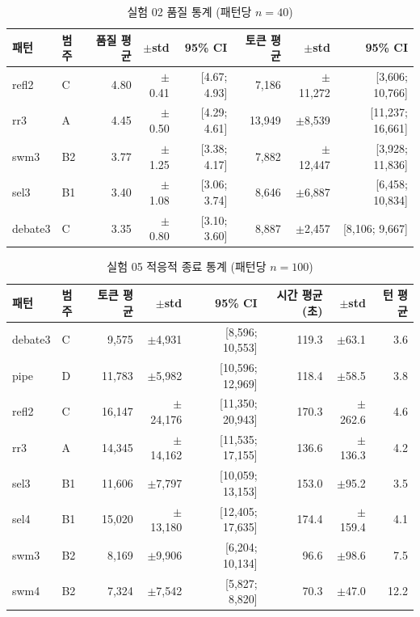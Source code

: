 \documentclass[a4paper,11pt]{article}
\begin{document}
\begin{table}[H]
\centering
\caption{실험 02 품질 통계 (패턴당 $n=40$)}
\label{tab:c2-exp02-stats}
{\footnotesize
\begin{tabular}{llrrrrrr}
\toprule
패턴 & 범주 & 품질 평균 & $\pm$std & 95\% CI & 토큰 평균 & $\pm$std & 95\% CI \\
\midrule
refl2   & C  & 4.80 & $\pm$0.41 & [4.67; 4.93]    & 7,186  & $\pm$11,272 & [3,606; 10,766] \\
rr3     & A  & 4.45 & $\pm$0.50 & [4.29; 4.61]    & 13,949 & $\pm$8,539  & [11,237; 16,661] \\
swm3    & B2 & 3.77 & $\pm$1.25 & [3.38; 4.17]    & 7,882  & $\pm$12,447 & [3,928; 11,836] \\
sel3    & B1 & 3.40 & $\pm$1.08 & [3.06; 3.74]    & 8,646  & $\pm$6,887  & [6,458; 10,834] \\
debate3 & C  & 3.35 & $\pm$0.80 & [3.10; 3.60]    & 8,887  & $\pm$2,457  & [8,106; 9,667] \\
\bottomrule
\end{tabular}
}
\end{table}

\begin{table}[H]
\centering
\caption{실험 05 적응적 종료 통계 (패턴당 $n=100$)}
\label{tab:c3-exp05-stats}
{\footnotesize
\begin{tabular}{llrrrrrr}
\toprule
패턴 & 범주 & 토큰 평균 & $\pm$std & 95\% CI & 시간 평균(초) & $\pm$std & 턴 평균 \\
\midrule
debate3 & C  & 9,575  & $\pm$4,931  & [8,596; 10,553]  & 119.3 & $\pm$63.1  & 3.6 \\
pipe    & D  & 11,783 & $\pm$5,982  & [10,596; 12,969] & 118.4 & $\pm$58.5  & 3.8 \\
refl2   & C  & 16,147 & $\pm$24,176 & [11,350; 20,943] & 170.3 & $\pm$262.6 & 4.6 \\
rr3     & A  & 14,345 & $\pm$14,162 & [11,535; 17,155] & 136.6 & $\pm$136.3 & 4.2 \\
sel3    & B1 & 11,606 & $\pm$7,797  & [10,059; 13,153] & 153.0 & $\pm$95.2  & 3.5 \\
sel4    & B1 & 15,020 & $\pm$13,180 & [12,405; 17,635] & 174.4 & $\pm$159.4 & 4.1 \\
swm3    & B2 & 8,169  & $\pm$9,906  & [6,204; 10,134]  & 96.6  & $\pm$98.6  & 7.5 \\
swm4    & B2 & 7,324  & $\pm$7,542  & [5,827; 8,820]   & 70.3  & $\pm$47.0  & 12.2 \\
\bottomrule
\end{tabular}
}
\end{table}
\end{document}
